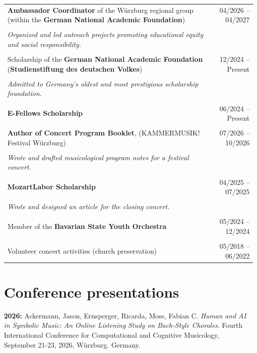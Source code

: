 \documentclass[11pt,a4paper]{article}
\begin{document}
\begin{tabularx}{\textwidth}{X r}

\textbf{Ambassador Coordinator} of the Würzburg regional group (within the \textbf{German National Academic Foundation}) & 04/2026 -- 04/2027 \\\\
\textit{Organized and led outreach projects promoting educational equity and social responsibility.} \\\\
Scholarship of the \textbf{German National Academic Foundation} 
(\textbf{Studienstiftung des deutschen Volkes}) & 12/2024 -- Present \\\\
\textit{Admitted to Germany's oldest and most prestigious scholarship foundation.} \\\\
\textbf{E-Fellows Scholarship} & 06/2024 -- Present \\\\
\textbf{Author of Concert Program Booklet}, (KAMMERMUSIK! Festival Würzburg) & 07/2026 -- 10/2026 \\\\
\textit{Wrote and drafted musicological program notes for a festival concert.}  & \\\\
\textbf{MozartLabor Scholarship} & 04/2025 -- 07/2025 \\\\
\textit{Wrote and designed an article for the closing concert.} \\\\
Member of the \textbf{Bavarian State Youth Orchestra} & 05/2024 -- 12/2024 \\\\
Volunteer concert activities (church preservation) & 05/2018 -- 06/2022
\end{tabularx}

\section{Conference presentations}
\textbf{2026:}
Ackermann, Jason, Ernsperger, Ricarda, Moss, Fabian C. \textit{Human and AI in Symbolic Music: An Online Listening Study on Bach-Style Chorales}. 
Fourth International Conference for Computational and Cognitive Musicology, September 21-23, 2026, Würzburg. Germany.
\end{document}
